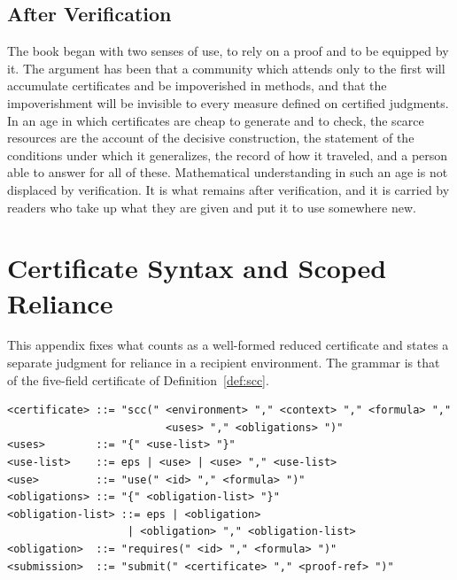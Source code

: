 \documentclass[11pt]{book}
\theoremstyle{definition}
\theoremstyle{remark}
\begin{document}
\section{After Verification}

The book began with two senses of use, to rely on a proof and to be equipped by it. The argument has been that a community which attends only to the first will accumulate certificates and be impoverished in methods, and that the impoverishment will be invisible to every measure defined on certified judgments. In an age in which certificates are cheap to generate and to check, the scarce resources are the account of the decisive construction, the statement of the conditions under which it generalizes, the record of how it traveled, and a person able to answer for all of these. Mathematical understanding in such an age is not displaced by verification. It is what remains after verification, and it is carried by readers who take up what they are given and put it to use somewhere new.

\appendix

\chapter{Certificate Syntax and Scoped Reliance}\label{app:A}

This appendix fixes what counts as a well-formed reduced certificate and states a separate judgment for reliance in a recipient environment. The grammar is that of the five-field certificate of Definition~\ref{def:scc}.

\begin{verbatim}
<certificate> ::= "scc(" <environment> "," <context> "," <formula> ","
                         <uses> "," <obligations> ")"
<uses>        ::= "{" <use-list> "}"
<use-list>    ::= eps | <use> | <use> "," <use-list>
<use>         ::= "use(" <id> "," <formula> ")"
<obligations> ::= "{" <obligation-list> "}"
<obligation-list> ::= eps | <obligation>
                   | <obligation> "," <obligation-list>
<obligation>  ::= "requires(" <id> "," <formula> ")"
<submission>  ::= "submit(" <certificate> "," <proof-ref> ")"
\end{verbatim}
\end{document}
